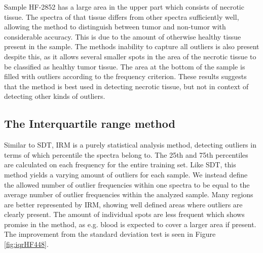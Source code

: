 Sample HF-2852 has a large area in the upper part which consists of necrotic tissue. The spectra of that tissue differs from other spectra sufficiently well, allowing the method to distinguish between tumor and non-tumor with considerable accuracy. This is due to the amount of otherwise healthy tissue present in the sample. The methods inability to capture all outliers is also present despite this, as it allows several smaller spots in the area of the necrotic tissue to be classified as healthy tumor tissue. The area at the bottom of the sample is filled with outliers according to the frequency criterion. These results suggests that the method is best used in detecting necrotic tissue, but not in context of detecting other kinds of outliers.

\subsection{The Interquartile range method}

Similar to SDT, IRM is a purely statistical analysis method, detecting outliers in terms of which percentile the spectra belong to. The 25th and 75th percentiles are calculated on each frequency for the entire training set. Like SDT, this method yields a varying amount of outliers for each sample. We instead define the allowed number of outlier frequencies within one spectra to be equal to the average number of outlier frequencies within the analyzed sample. Many regions are better represented by IRM, showing well defined areas where outliers are clearly present. The amount of individual spots are less frequent which shows promise in the method, as e.g. blood is expected to cover a larger area if present. The improvement from the standard deviation test is seen in Figure \ref{fig:iqrHF448}.

